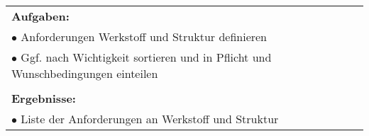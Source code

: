 \begin{table}[!h]
\begin{center}
\begin{tabular}{|p{35mm}||p{55mm}|p{50mm}||p{40mm}|}
			\multicolumn{4}{|p{150mm}|}{\textbf{Aufgaben:}}\\
			\multicolumn{4}{|p{150mm}|}{$\bullet$ Anforderungen Werkstoff und Struktur definieren}\\
			\multicolumn{4}{|p{150mm}|}{$\bullet$ Ggf. nach Wichtigkeit sortieren und in Pflicht und Wunschbedingungen einteilen}\\
			\multicolumn{4}{|p{150mm}|}{}\\
			\multicolumn{4}{|p{150mm}|}{\textbf{Ergebnisse:}}\\
			\multicolumn{4}{|p{150mm}|}{$\bullet$ Liste der Anforderungen an Werkstoff und Struktur}\\
			\hline
		\end{tabular}
	\end{center}
\end{table}

